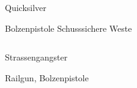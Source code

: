 \begin{column}[l]{0.45}
    \begin{nscsheet}[h]{Quicksilver}
        \nscstats[ATT=2,AGG=2,DEX=1,COM=2,CON=1]
        \nscruler
        \begin{nscinventory}
            \nscitem[Waffen] Bolzenpistole
            \nscitem[R"ustung] Schusssichere Weste
        \end{nscinventory}
    \end{nscsheet}
\end{column}
\begin{column}[r]{0.50}
    \begin{nscsheet}[h]{Strassengangster}
        \nscstats[ATT=2,AGG=2,DEX=1,CON=1]
        \nscruler
        \begin{nscinventory}
            \nscitem[Waffen] Railgun, Bolzenpistole
        \end{nscinventory}
    \end{nscsheet}
\end{column}
